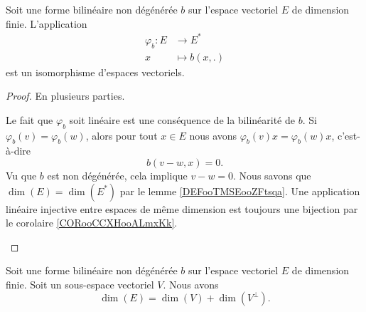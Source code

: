 \begin{proposition}		\label{PROPooMAZZooRZZoHj}
	Soit une forme bilinéaire non dégénérée \( b\) sur l'espace vectoriel \( E\) de dimension finie. L'application
	\begin{equation}
		\begin{aligned}
			\varphi_b\colon E & \to E^*        \\
			x                 & \mapsto b(x,.)
		\end{aligned}
	\end{equation}
	est un isomorphisme d'espaces vectoriels.
\end{proposition}

\begin{proof}
	En plusieurs parties.
	\begin{subproof}
		\spitem[Linéaire]

		Le fait que \( \varphi_b\) soit linéaire est une conséquence de la bilinéarité de \( b\).
		\spitem[Injectif]
		Si \( \varphi_b(v)=\varphi_b(w)\), alors pour tout \( x\in E\) nous avons \( \varphi_b(v)x=\varphi_b(w)x\), c'est-à-dire
		\begin{equation}
			b(v-w,x)=0.
		\end{equation}
		Vu que \( b\) est non dégénérée, cela implique \( v-w=0\).
		\spitem[Isomorphisme]
		Nous savons que \( \dim(E)=\dim(E^*)\) par le lemme \ref{DEFooTMSEooZFtsqa}. Une application linéaire injective entre espaces de même dimension est toujours une bijection par le corolaire \ref{CORooCCXHooALmxKk}.
	\end{subproof}

\end{proof}

\begin{lemma}		\label{LEMooRXMMooAvvOjF}
	Soit une forme bilinéaire non dégénérée \( b\) sur l'espace vectoriel \( E\) de dimension finie. Soit un sous-espace vectoriel \( V\). Nous avons
	\begin{equation}		\label{EQooLFJBooNNIHgP}
		\dim(E)=\dim(V)+\dim(V^{\perp}).
	\end{equation}
\end{lemma}

